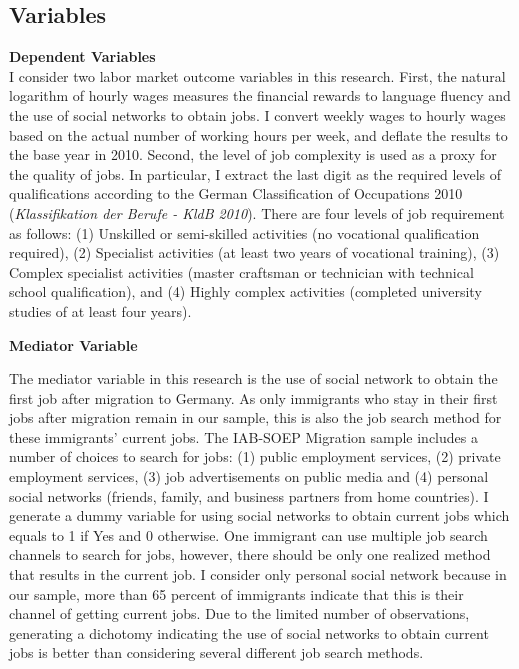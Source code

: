 \documentclass[12pt,a4paper]{article}
\begin{document}
\subsection{Variables}
\textbf{Dependent Variables} \\
I consider two labor market outcome variables in this research. First, the natural logarithm of hourly wages measures the financial rewards to language fluency and the use of social networks to obtain jobs. I convert weekly wages to hourly wages based on the actual number of working hours per week, and deflate the results to the base year in 2010. Second, the level of job complexity is used as a proxy for the quality of jobs. In particular, I extract the last digit as the required levels of qualifications according to the German Classification of Occupations 2010 (\textit{Klassifikation der Berufe - KldB 2010}). There are four levels of job requirement as follows: (1) Unskilled or semi-skilled activities (no vocational qualification required), (2) Specialist activities (at least two years of vocational training), (3) Complex specialist activities (master craftsman or technician with technical school qualification), and (4) Highly complex activities (completed university studies of at least four years). 

\begin{flushleft}
\textbf{Mediator Variable} 
\end{flushleft}

The mediator variable in this research is the use of social network to obtain the first job after migration to Germany. As only immigrants who stay in their first jobs after migration remain in our sample, this is also the job search method for these immigrants' current jobs. The IAB-SOEP Migration sample includes a number of choices to search for jobs: (1) public employment services, (2) private employment services, (3) job advertisements on public media and (4) personal social networks (friends, family, and business partners from home countries). I generate a dummy variable for using social networks to obtain current jobs which equals to 1 if Yes and 0 otherwise. One immigrant can use multiple job search channels to search for jobs, however, there should be only one realized method that results in the current job. I consider only personal social network because in our sample, more than 65 percent of immigrants indicate that this is their channel of getting current jobs. Due to the limited number of observations, generating a dichotomy indicating the use of social networks to obtain current jobs is better than considering several different job search methods. 
\end{document}
